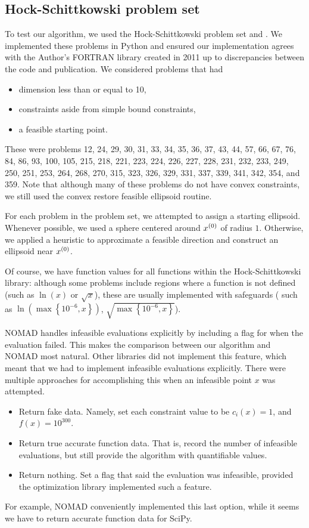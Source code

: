 \subsection{Hock-Schittkowski problem set}

To test our algorithm, we used the Hock-Schittkowski problem set \cite{Hock1980} and \cite{Schittkowski1981MoreTE}.
We implemented these problems in Python and ensured our implementation agrees with the Author's FORTRAN library created in 2011 
up to discrepancies between the code and publication.
We considered problems that had
\begin{itemize}
\item dimension less than or equal to 10,
\item constraints aside from simple bound constraints,
\item a feasible starting point.
\end{itemize}

These were problems
12,
24,
29,
30,
31,
33,
34,
35,
36,
37,
43,
44,
57,
66,
67,
76,
84,
86,
93,
100,
105,
215,
218,
221,
223,
224,
226,
227,
228,
231,
232,
233,
249,
250,
251,
253,
264,
268,
270,
315,
323,
326,
329,
331,
337,
339,
341,
342,
354,
and 359.
Note that although many of these problems do not have convex constraints, we still used the convex restore feasible ellipsoid routine.

For each problem in the problem set, we attempted to assign a starting ellipsoid.
Whenever possible, we used a sphere centered around ${x^{(0)}}$ of radius $1$.
Otherwise, we applied a heuristic to approximate a feasible direction and construct an ellipsoid near ${x^{(0)}}$.

Of course, we have function values for all functions within the Hock-Schittkowski library:
although some problems include regions where a function is not defined (such as $\ln(x)$ or $\sqrt{x}$), 
these are usually implemented with safeguards (
such as $\ln\left(\max\left\{10^{-6}, x\right\}\right)$, $\sqrt{\max\left\{10^{-6}, x\right\}}$).

NOMAD handles infeasible evaluations explicitly by including a flag for when the evaluation failed.
This makes the comparison between our algorithm and NOMAD most natural.
Other libraries did not implement this feature, which meant that we had to implement infeasible evaluations explicitly.
There were multiple approaches for accomplishing this when an infeasible point $x$ was attempted.

\begin{itemize}
\item Return fake data. Namely, set each constraint value to be $c_i(x) = 1$, and $f(x) = 10^{300}$.
\item Return true accurate function data. That is, record the number of infeasible evaluations, but still provide the algorithm with quantifiable values.
\item Return nothing. Set a flag that said the evaluation was infeasible, provided the optimization library implemented such a feature.
\end{itemize}
For example, NOMAD conveniently implemented this last option, while it seems we have to return accurate function data for SciPy.



